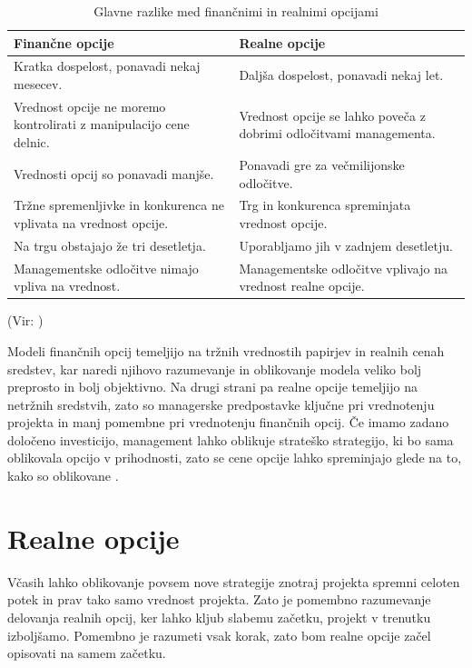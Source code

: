 \begin{table}[ht]
	\caption{Glavne razlike med finančnimi in realnimi opcijami}
	\centering
	\begin{tabular}{|L|L|}
	\hline
	\textbf{Finančne opcije}&\textbf{Realne opcije}\\
	\hline
	\hline
	Kratka dospelost, ponavadi nekaj mesecev. & Daljša dospelost, ponavadi nekaj let. \\
	\hline
	Vrednost opcije ne moremo kontrolirati z manipulacijo cene delnic. & Vrednost opcije se lahko poveča z dobrimi odločitvami managementa. \\
	\hline
	 Vrednosti opcij so ponavadi manjše. & Ponavadi gre za večmilijonske odločitve. \\
	\hline
	Tržne spremenljivke in konkurenca ne vplivata na vrednost opcije. & Trg in konkurenca spreminjata vrednost opcije. \\
	\hline
	Na trgu obstajajo že tri desetletja. & Uporabljamo jih v zadnjem desetletju. \\
	\hline
	Managementske odločitve nimajo vpliva na vrednost. & Managementske odločitve vplivajo na vrednost realne opcije. \\
	\hline
\end{tabular}
	\label{table: tabela4}
\end{table}  
(Vir: \cite[str. 110]{Mun})

Modeli finančnih opcij temeljijo na tržnih vrednostih papirjev in realnih cenah sredstev, kar naredi njihovo razumevanje in oblikovanje modela veliko bolj preprosto in bolj objektivno. Na drugi strani pa realne opcije temeljijo na netržnih sredstvih, zato so managerske predpostavke ključne pri vrednotenju projekta in manj pomembne pri vrednotenju finančnih opcij. Če imamo zadano določeno investicijo, management lahko oblikuje strateško strategijo, ki bo sama oblikovala opcijo v prihodnosti, zato se cene opcije lahko spreminjajo glede na to, kako so oblikovane \cite[str. 110, 111]{Mun}. \\

\section{Realne opcije}
Včasih lahko oblikovanje povsem nove strategije znotraj projekta spremni celoten potek in prav tako samo vrednost projekta. Zato je pomembno razumevanje delovanja realnih opcij, ker lahko kljub slabemu začetku, projekt v trenutku izboljšamo. Pomembno je razumeti vsak korak, zato bom realne opcije začel opisovati na samem začetku.

